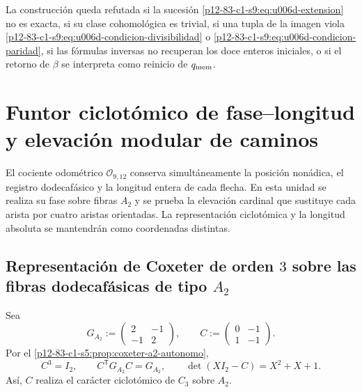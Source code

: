 {\begin{criterion}
\label{p12-83-c1-s9:crit:u006d-refutacion}
La construcción queda refutada si la sucesión
\eqref{p12-83-c1-s9:eq:u006d-extension} no es exacta, si su clase cohomológica es
trivial, si una tupla de la imagen viola
\eqref{p12-83-c1-s9:eq:u006d-condicion-divisibilidad} o
\eqref{p12-83-c1-s9:eq:u006d-condicion-paridad}, si las fórmulas inversas no recuperan
los doce enteros iniciales, o si el retorno de \(\beta\) se interpreta como
reinicio de \(q_{\rm mem}\).
\end{criterion}



\section{Funtor ciclotómico de fase--longitud y elevación modular de caminos}
\label{p12-83-c1-s10:chap:funtor-ciclotomico-elevacion-caminos}

El cociente odométrico \(\mathcal O_{9,12}\) conserva simultáneamente la
posición nonádica, el registro dodecafásico y la longitud entera de cada
flecha. En esta unidad se realiza su fase sobre fibras \(A_2\) y se prueba
la elevación cardinal que sustituye cada arista por cuatro aristas
orientadas. La representación ciclotómica y la longitud absoluta se
mantendrán como coordenadas distintas.

\subsection{Representación de Coxeter de orden \(3\) sobre las fibras dodecafásicas de tipo \(A_2\)}

Sea
\begin{equation}
 G_{A_2}:=
 \begin{pmatrix}2&-1\\-1&2\end{pmatrix},
 \qquad
 C:=
 \begin{pmatrix}0&-1\\1&-1\end{pmatrix}.
 \label{p12-83-c1-s10:eq:u006b-dato-coxeter}
\end{equation}
Por el \cref{p12-83-c1-s5:prop:coxeter-a2-autonomo},
\begin{equation}
 C^3=I_2,
 \qquad
 C^{\mathsf T}G_{A_2}C=G_{A_2},
 \qquad
 \det(XI_2-C)=X^2+X+1.
 \label{p12-83-c1-s10:eq:u006b-identidades-coxeter}
\end{equation}
Así, \(C\) realiza el carácter ciclotómico de \(C_3\) sobre \(A_2\).

}
